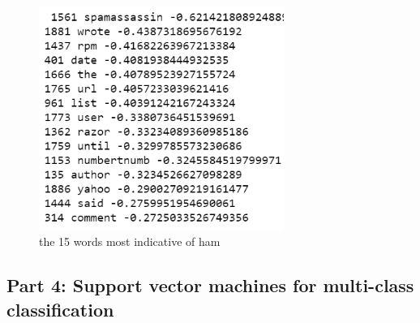 \documentclass[]{book}
\theoremstyle{definition}
\begin{document}
\begin{figure}[H]
	\centering
	\includegraphics[width=8cm]{ham.png}
	\caption{the 15 words most indicative of ham}
	\label{fig:12}
\end{figure}
\subsection*{Part 4: Support vector machines for multi-class classification }
\end{document}
